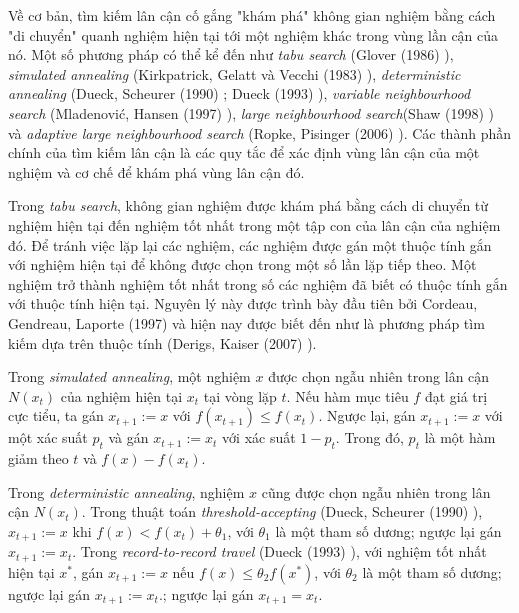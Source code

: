 Về cơ bản, tìm kiếm lân cận cố gắng "khám phá" không gian nghiệm bằng cách "di chuyển" quanh nghiệm hiện tại tới một nghiệm khác trong vùng lần cận của nó. Một số phương pháp có thể kể đến như \textit{tabu search} (Glover (1986) \cite{glover1986future}), \textit{simulated annealing} (Kirkpatrick, Gelatt và Vecchi
(1983) \cite{kirkpatrick1983optimization}), \textit{deterministic annealing} (Dueck, Scheurer
(1990) \cite{dueck1990threshold}; Dueck (1993) \cite{dueck1993new}), \textit{variable neighbourhood search} (Mladenović, Hansen (1997) \cite{mladenovic1997variable}), \textit{large neighbourhood search}(Shaw (1998) \cite{shaw1998using}) và \textit{adaptive large neighbourhood search} (Ropke, Pisinger (2006) \cite{ropke2006adaptive}). Các thành phần chính của tìm kiếm lân cận là các quy tắc để xác định vùng lân cận của một nghiệm và cơ chế để khám phá vùng lân cận đó.

Trong \textit{tabu search}, không gian nghiệm được khám phá bằng cách di chuyển từ nghiệm hiện tại đến nghiệm tốt nhất trong một tập con của lân cận của nghiệm đó. Để tránh việc lặp lại các nghiệm, các nghiệm được gán một thuộc tính gắn với nghiệm hiện tại để không được chọn trong một số lần lặp tiếp theo. Một nghiệm trở thành nghiệm tốt nhất trong số các nghiệm đã biết có thuộc tính gắn với thuộc tính hiện tại. Nguyên lý này được trình bày đầu tiên bởi Cordeau, Gendreau, Laporte (1997) \cite{cordeau1997tabu} và hiện nay được biết đến như là phương pháp tìm kiếm dựa trên thuộc tính (Derigs, Kaiser (2007) \cite{derigs2007applying}).

Trong \textit{simulated annealing}, một nghiệm $x$ được chọn ngẫu nhiên trong lân cận $N(x_t)$ của nghiệm hiện tại $x_t$ tại vòng lặp $t$. Nếu hàm mục tiêu $f$ đạt giá trị cực tiểu, ta gán $x_{t+1}:=x$ với $f(x_{t+1}) \leq f(x_t)$. Ngược lại, gán $x_{t+1}:=x$ với một xác suất $p_t$ và gán $x_{t+1}:=x_t$ với xác suất $1-p_t$. Trong đó, $p_t$ là một hàm giảm theo $t$ và $f(x) - f(x_t)$.

Trong \textit{deterministic annealing}, nghiệm $x$ cũng được chọn ngẫu nhiên trong lân cận $N(x_t)$. Trong thuật toán \textit{threshold-accepting} (Dueck, Scheurer (1990) \cite{dueck1990threshold}), $x_{t+1}:=x$ khi $f(x) < f(x_t) + \theta_1$, với $\theta_1$ là một tham số dương; ngược lại gán $x_{t+1}:=x_t$. Trong \textit{record-to-record travel} (Dueck (1993) \cite{dueck1993new}), với nghiệm tốt nhất hiện tại $x^*$, gán $x_{t+1}:=x$ nếu $f(x) \leq \theta_2 f(x^*)$, với $\theta_2$ là một tham số dương; ngược lại gán $x_{t+1}:=x_t$.; ngược lại gán $x_{t+1}=x_t$.

